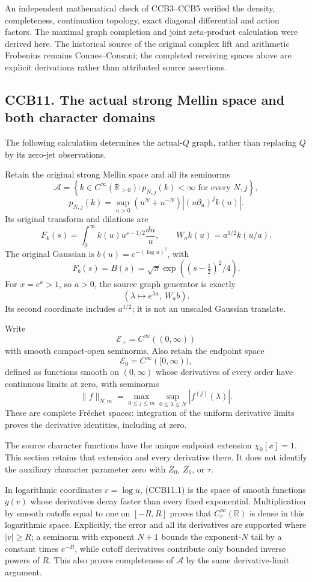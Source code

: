 An independent mathematical check of CCB3--CCB5 verified the density,
completeness, continuation topology, exact diagonal differential and
action factors. The maximal graph completion and joint zeta-product
calculation were derived here. The historical source of the original
complex lift and arithmetic Frobenius remains Connes--Consani; the
completed receiving spaces above are explicit derivations rather than
attributed source assertions.

\subsection{CCB11. The actual strong Mellin space and both character
domains}\label{ccb11.-the-actual-strong-mellin-space-and-both-character-domains}

The following calculation determines the actual-\(Q\) graph, rather than
replacing \(Q\) by its zero-jet observations.

Retain the original strong Mellin space and all its seminorms \[
\mathcal A=
\left\{k\in C^\infty(\mathbb R_{>0}):
p_{N,j}(k)<\infty\text{ for every }N,j\right\},
\] \[
p_{N,j}(k)=
\sup_{u>0}(u^N+u^{-N})|(u\partial_u)^jk(u)|.
\tag{CCB11.1}
\] Its original transform and dilations are \[
F_k(s)=\int_0^\infty k(u)u^{s-1/2}\frac{du}{u},
\qquad
W_a k(u)=a^{1/2}k(u/a).
\] The original Gaussian is \(b(u)=e^{-(\log u)^2}\), with \[
F_b(s)=B(s)=\sqrt\pi\exp((s-\tfrac12)^2/4).
\tag{CCB11.2}
\] For \(x=e^a>1\), so \(a>0\), the source graph generator is exactly \[
\left(\lambda\longmapsto e^{\lambda a},\ W_a b\right).
\tag{CCB11.3}
\] Its second coordinate includes \(a^{1/2}\); it is not an unscaled
Gaussian translate.

Write \[
\mathscr E_+=C^\infty((0,\infty))
\] with smooth compact-open seminorms. Also retain the endpoint space \[
\mathscr E_0=C^\infty([0,\infty)),
\] defined as functions smooth on \((0,\infty)\) whose derivatives of
every order have continuous limits at zero, with seminorms \[
\|f\|_{N,m}=\max_{0\le j\le m}\sup_{0\le\lambda\le N}|f^{(j)}(\lambda)|.
\tag{CCB11.4}
\] These are complete Fréchet spaces: integration of the uniform
derivative limits proves the derivative identities, including at zero.

The source character functions have the unique endpoint extension
\(\chi_0[x]=1\). This section retains that extension and every
derivative there. It does not identify the auxiliary character parameter
zero with \(Z_0\), \(Z_1\), or \(\tau\).

In logarithmic coordinates \(v=\log u\), (CCB11.1) is the space of
smooth functions \(g(v)\) whose derivatives decay faster than every
fixed exponential. Multiplication by smooth cutoffs equal to one on
\([-R,R]\) proves that \(C_c^\infty(\mathbb R)\) is dense in this
logarithmic space. Explicitly, the error and all its derivatives are
supported where \(|v|\ge R\); a seminorm with exponent \(N+1\) bounds
the exponent-\(N\) tail by a constant times \(e^{-R}\), while cutoff
derivatives contribute only bounded inverse powers of \(R\). This also
proves completeness of \(\mathcal A\) by the same derivative-limit
argument.

